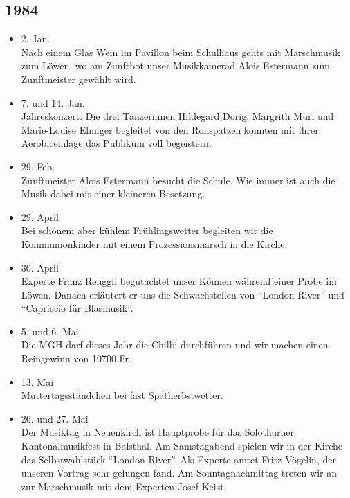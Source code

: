 \subsection*{1984}

\begin{history}


    \begin{itemize}

        \item 2. Jan.\\
              Nach einem Glas Wein im Pavillon beim Schulhaus gehts mit Marschmusik
              zum Löwen, wo am Zunftbot unser Musikkamerad Alois Estermann zum
              Zunftmeister gewählt wird.

        \item 7. und 14. Jan.\\
              Jahreskonzert. Die drei Tänzerinnen Hildegard Dörig, Margrith Muri und
              Marie-Louise Elmiger begleitet von den Ronspatzen konnten mit ihrer
              Aerobiceinlage das Publikum voll begeistern.

        \item 29. Feb.\\
              Zunftmeister Alois Estermann besucht die Schule. Wie immer ist auch die
              Musik dabei mit einer kleineren Besetzung.

        \item 29. April\\
              Bei schönem aber kühlem Frühlingswetter begleiten wir die
              Kommunionkinder mit einem Prozessionsmarsch in die Kirche.

        \item 30. April\\
              Experte Franz Renggli begutachtet unser Können während einer Probe im
              Löwen. Danach erläutert er uns die Schwachstellen von \enquote{London
                  River} und \enquote{Capriccio für Blasmusik}.

        \item 5. und 6. Mai\\
              Die MGH darf dieses Jahr die Chilbi durchführen und wir machen einen
              Reingewinn von 10700 Fr.

        \item 13. Mai\\
              Muttertagsständchen bei fast Spätherbstwetter.

        \item 26. und 27. Mai\\
              Der Musiktag in Neuenkirch ist Hauptprobe für das Solothurner
              Kantonalmusikfest in Balsthal. Am Samstagabend spielen wir in der Kirche
              das Selbstwahlstück \enquote{London River}. Als Experte amtet Fritz
              Vögelin, der unseren Vortrag sehr gelungen fand. Am Sonntagnachmittag
              treten wir an zur Marschmusik mit dem Experten Josef Keist.


\end{itemize}
\end{history}
